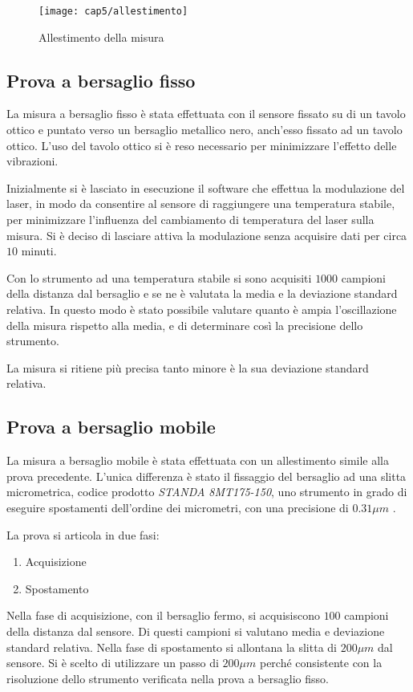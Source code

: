 \begin{figure}[H]
  \begin{center}
    \texttt{[image: cap5/allestimento]}
    \caption{Allestimento della misura}
  \end{center}
\end{figure}

\subsection{Prova a bersaglio fisso}
La misura a bersaglio fisso è stata effettuata con il sensore fissato su di un tavolo ottico e puntato verso un bersaglio metallico nero, anch'esso fissato ad un tavolo ottico. L'uso del tavolo ottico si è reso necessario per minimizzare l'effetto delle vibrazioni.

Inizialmente si è lasciato in esecuzione il software che effettua la modulazione del laser, in modo da consentire al sensore di raggiungere una temperatura stabile, per minimizzare l'influenza del cambiamento di temperatura del laser sulla misura. Si è deciso di lasciare attiva la modulazione senza acquisire dati per circa $10$ minuti.

Con lo strumento ad una temperatura stabile si sono acquisiti $1000$ campioni della distanza dal bersaglio e se ne è valutata la media e la deviazione standard relativa. In questo modo è stato possibile valutare quanto è ampia l'oscillazione della misura rispetto alla media, e di determinare così la precisione dello strumento.

La misura si ritiene più precisa tanto minore è la sua deviazione standard relativa.

\subsection{Prova a bersaglio mobile}
La misura a bersaglio mobile è stata effettuata con un allestimento simile alla prova precedente. L'unica differenza è stato il fissaggio del bersaglio ad una slitta micrometrica, codice prodotto \textit{STANDA 8MT175-150}, uno strumento in grado di eseguire spostamenti dell'ordine dei micrometri, con una precisione di $0.31 \mu m$ \cite{standa}.

La prova si articola in due fasi:
\begin{enumerate}
	\item Acquisizione
	\item Spostamento
\end{enumerate}
Nella fase di acquisizione, con il bersaglio fermo, si acquisiscono $100$ campioni della distanza dal sensore. Di questi campioni si valutano media e deviazione standard relativa.
Nella fase di spostamento si allontana la slitta di $200 \mu m$ dal sensore. Si è scelto di utilizzare un passo di $200 \mu m$ perché consistente con la risoluzione dello strumento verificata nella prova a bersaglio fisso.


